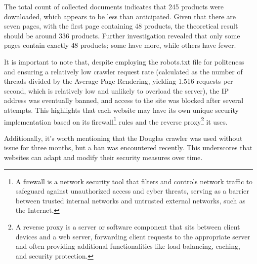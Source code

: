 {The total count of collected documents indicates that 245 products were downloaded, which appears to be less than anticipated. Given that there are seven pages, with the first page containing 48 products, the theoretical result should be around 336 products. Further investigation revealed that only some pages contain exactly 48 products; some have more, while others have fewer.

It is important to note that, despite employing the robots.txt file for politeness and ensuring a relatively low crawler request rate (calculated as the number of threads divided by the Average Page Rendering, yielding 1.516 requests per second, which is relatively low and unlikely to overload the server), the IP address was eventually banned, and access to the site was blocked after several attempts. This highlights that each website may have its own unique security implementation based on its firewall\footnote{A firewall is a network security tool that filters and controls network traffic to safeguard against unauthorized access and cyber threats, serving as a barrier between trusted internal networks and untrusted external networks, such as the Internet.} rules and the reverse proxy\footnote{A reverse proxy is a server or software component that sits between client devices and a web server, forwarding client requests to the appropriate server and often providing additional functionalities like load balancing, caching, and security protection.} it uses.

Additionally, it's worth mentioning that the Douglas crawler was used without issue for three months, but a ban was encountered recently. This underscores that websites can adapt and modify their security measures over time.

}
